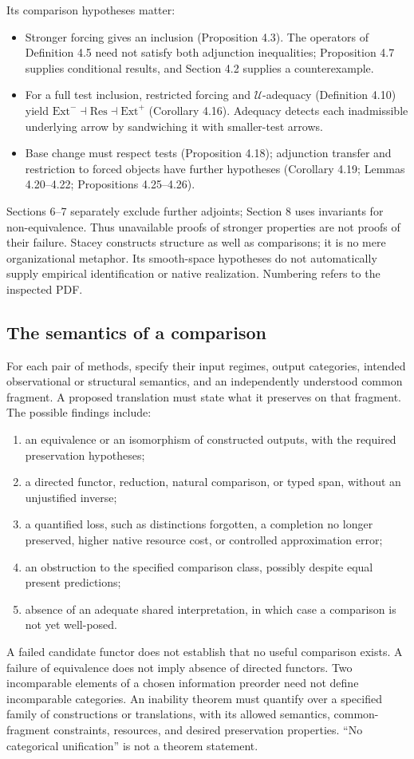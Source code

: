 \documentclass[11pt]{article}
\theoremstyle{remark}
\begin{document}
Its comparison hypotheses matter:
\begin{itemize}
\item Stronger forcing gives an inclusion (Proposition 4.3). The operators of Definition 4.5 need not satisfy both adjunction inequalities; Proposition 4.7 supplies conditional results, and Section 4.2 supplies a counterexample.
\item For a full test inclusion, restricted forcing and $\mathcal U$-adequacy (Definition 4.10) yield $\mathrm{Ext}^{-}\dashv\mathrm{Res}\dashv\mathrm{Ext}^{+}$ (Corollary 4.16). Adequacy detects each inadmissible underlying arrow by sandwiching it with smaller-test arrows.
\item Base change must respect tests (Proposition 4.18); adjunction transfer and restriction to forced objects have further hypotheses (Corollary 4.19; Lemmas 4.20--4.22; Propositions 4.25--4.26).
\end{itemize}
Sections 6--7 separately exclude further adjoints; Section 8 uses invariants for non-equivalence. Thus unavailable proofs of stronger properties are not proofs of their failure. Stacey constructs structure as well as comparisons; it is no mere organizational metaphor. Its smooth-space hypotheses do not automatically supply empirical identification or native realization. Numbering refers to the inspected PDF.

\subsection{The semantics of a comparison}

For each pair of methods, specify their input regimes, output categories, intended observational or structural semantics, and an independently understood common fragment. A proposed translation must state what it preserves on that fragment. The possible findings include:
\begin{enumerate}
\item an equivalence or an isomorphism of constructed outputs, with the required preservation hypotheses;
\item a directed functor, reduction, natural comparison, or typed span, without an unjustified inverse;
\item a quantified loss, such as distinctions forgotten, a completion no longer preserved, higher native resource cost, or controlled approximation error;
\item an obstruction to the specified comparison class, possibly despite equal present predictions;
\item absence of an adequate shared interpretation, in which case a comparison is not yet well-posed.
\end{enumerate}
A failed candidate functor does not establish that no useful comparison exists. A failure of equivalence does not imply absence of directed functors. Two incomparable elements of a chosen information preorder need not define incomparable categories. An inability theorem must quantify over a specified family of constructions or translations, with its allowed semantics, common-fragment constraints, resources, and desired preservation properties. ``No categorical unification'' is not a theorem statement.
\end{document}
